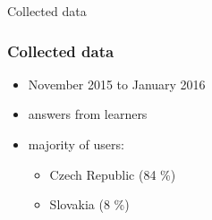\documentclass[bigger]{beamer}
\begin{document}
\begin{frame}
	\begin{center}
    {\Huge Collected data} 
	\end{center}
\end{frame}

\begin{frame}
	\frametitle{Collected data}
	\begin{itemize}
		\item November 2015 to January 2016
		\item {} answers from  learners
		\item majority of users:
			\begin{itemize}
				\item Czech Republic (84 \%)
				\item Slovakia (8 \%)
			\end{itemize}
	\end{itemize}
\end{frame}
\end{document}
